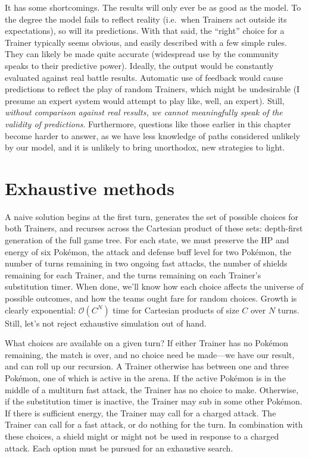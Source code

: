 It has some shortcomings.
The results will only ever be as good as the model.
To the degree the model fails to reflect reality (i.e.\ when Trainers act outside
 its expectations), so will its predictions.
With that said, the ``right'' choice for a Trainer typically seems obvious,
 and easily described with a few simple rules.
They can likely be made quite accurate (widespread use by the community speaks to their predictive power).
Ideally, the output would be constantly evaluated against real battle results.
Automatic use of feedback would cause predictions to reflect the play of random Trainers,
 which might be undesirable (I presume an expert system would attempt to play like, well, an expert).
Still, \textit{without comparison against real results, we cannot meaningfully speak of the validity of predictions}.
Furthermore, questions like those earlier in this chapter become harder to answer,
 as we have less knowledge of paths considered unlikely by our model,
 and it is unlikely to bring unorthodox, new strategies to light.

\section{Exhaustive methods\label{sec:exhaustive}}
A naive solution begins at the first turn, generates the set of possible
  choices for both Trainers, and recurses across the Cartesian product
  of these sets: depth-first generation of the full game tree.
For each state, we must preserve the HP and energy of six Pokémon,
  the attack and defense buff level for two Pokémon,
  the number of turns remaining in two ongoing fast attacks,
  the number of shields remaining for each Trainer,
  and the turns remaining on each Trainer's substitution timer.
When done, we'll know how each choice affects the universe of possible outcomes,
  and how the teams ought fare for random choices.
Growth is clearly exponential: $\mathcal{O}(C^N)$ time for Cartesian products of size $C$ over $N$ turns.
Still, let's not reject exhaustive simulation out of hand.

What choices are available on a given turn?
If either Trainer has no Pokémon remaining, the match is over, and no choice
  need be made---we have our result, and can roll up our recursion.
A Trainer otherwise has between one and three Pokémon, one of which is active
  in the arena.
If the active Pokémon is in the middle of a multiturn fast attack, the
  Trainer has no choice to make.
Otherwise, if the substitution timer is inactive, the Trainer may sub in some other Pokémon.
If there is sufficient energy, the Trainer may call for a charged attack.
The Trainer can call for a fast attack, or do nothing for the turn.
In combination with these choices, a shield might or might not be used in response to a charged attack.
Each option must be pursued for an exhaustive search.


